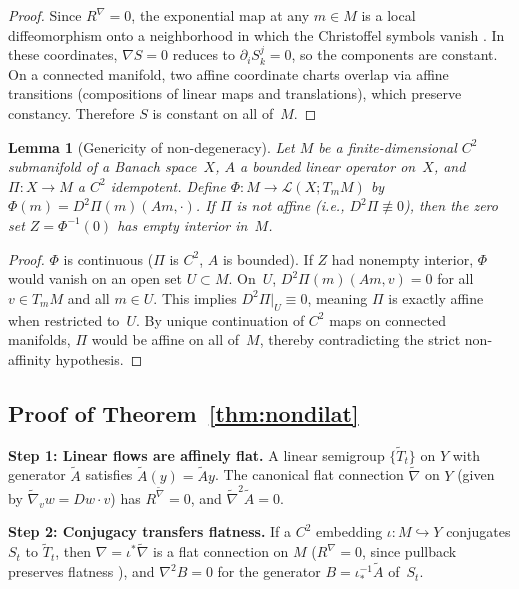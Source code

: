 \documentclass[12pt,a4paper]{amsart}
\theoremstyle{plain}
\newtheorem{lemma}[theorem]{Lemma}
\theoremstyle{definition}
\theoremstyle{remark}
\begin{document}
\begin{proof}
Since $R^{\nabla} = 0$, the exponential map at any $m \in M$ is a
local diffeomorphism onto a neighborhood in which the Christoffel
symbols vanish \cite[Prop.~VII.5.2]{Lang99}. In these coordinates,
$\nabla S = 0$ reduces to $\partial_i S^j_k = 0$, so the components
are constant. On a connected manifold, two affine coordinate charts
overlap via affine transitions (compositions of linear maps and
translations), which preserve constancy. Therefore $S$ is constant
on all of~$M$.
\end{proof}

\begin{lemma}[Genericity of non-degeneracy]\label{lem:generic}
Let $M$ be a finite-dimensional $C^2$ submanifold of a Banach
space~$X$, $A$ a bounded linear operator on~$X$, and
$\Pi\colon X \to M$ a $C^2$ idempotent. Define
$\Phi\colon M \to \mathcal{L}(X; T_m M)$ by
$\Phi(m) = D^2\Pi(m)(Am, \cdot)$. If $\Pi$ is not affine (i.e.,
$D^2\Pi \not\equiv 0$), then the zero set
$Z = \Phi^{-1}(0)$ has empty interior in~$M$.
\end{lemma}

\begin{proof}
$\Phi$ is continuous ($\Pi$ is $C^2$, $A$ is bounded). If $Z$ had
nonempty interior, $\Phi$ would vanish on an open set $U \subset M$.
On~$U$, $D^2\Pi(m)(Am, v) = 0$ for all $v \in T_m M$ and all
$m \in U$. This implies $D^2\Pi|_U \equiv 0$, meaning $\Pi$ is
exactly affine when restricted to~$U$. By unique continuation of $C^2$
maps on connected manifolds, $\Pi$ would be affine on all of~$M$,
thereby contradicting the strict non-affinity hypothesis.
\end{proof}

\subsection{Proof of Theorem~\ref{thm:nondilat}}

\noindent\textbf{Step 1: Linear flows are affinely flat.}
A linear semigroup $\{\tilde{T}_t\}$ on $Y$ with generator $\tilde{A}$
satisfies $\tilde{A}(y) = \tilde{A} y$. The canonical flat connection
$\tilde{\nabla}$ on $Y$ (given by $\tilde{\nabla}_v w = Dw \cdot v$)
has $R^{\tilde{\nabla}} = 0$, and $\tilde{\nabla}^2 \tilde{A} = 0$.

\medskip
\noindent\textbf{Step 2: Conjugacy transfers flatness.}
If a $C^2$ embedding $\iota\colon M \hookrightarrow Y$ conjugates
$S_t$ to $\tilde{T}_t$, then $\nabla = \iota^* \tilde{\nabla}$ is a
flat connection on $M$ ($R^{\nabla} = 0$, since pullback preserves
flatness \cite[\S VII.3]{Lang99}), and $\nabla^2 B = 0$ for the
generator $B = \iota^{-1}_* \tilde{A}$ of~$S_t$.
\end{document}

